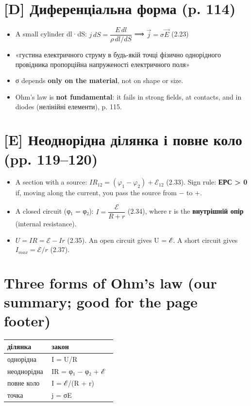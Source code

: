 \documentclass[11pt,a4paper,oneside]{book}
\begin{document}
\section*{[D] Диференціальна форма (p. 114)}
\begin{itemize}
\item A small cylinder dl·dS: $j\,dS = \dfrac{E\,dl}{\rho\,dl/dS}$ ⟹ $\vec j = \sigma\vec E$ (2.23)
\item «густина електричного струму в будь-якій точці фізично однорідного провідника пропорційна напруженості електричного поля»
\item σ depends \textbf{only on the material}, not on shape or size.
\item Ohm's law is \textbf{not fundamental}: it fails in strong fields, at contacts, and in diodes (нелінійні елементи), p. 115.
\end{itemize}

\section*{[E] Неоднорідна ділянка і повне коло (pp. 119–120)}
\begin{itemize}
\item A section with a source: $IR_{12} = (\varphi_1-\varphi_2) + \mathcal E_{12}$ (2.33). Sign rule: \textbf{ЕРС > 0} if, moving along the current, you pass the source from − to +.
\item A closed circuit (φ₁ = φ₂): $I = \dfrac{\mathcal E}{R+r}$ (2.34), where r is the \textbf{внутрішній опір} (internal resistance).
\item $U = IR = \mathcal E - Ir$ (2.35). An open circuit gives U = ℰ. A short circuit gives $I_{max} = \mathcal E/r$ (2.37).
\end{itemize}

\section*{Three forms of Ohm's law (our summary; good for the page footer)}
{\small
\begin{longtable}{>{\raggedright\arraybackslash}p{0.394\linewidth}>{\raggedright\arraybackslash}p{0.574\linewidth}}
\toprule
\textbf{ділянка} & \textbf{закон} \\
\midrule
\endhead
однорідна & I = U/R \\
неоднорідна & IR = φ₁ − φ₂ + ℰ \\
повне коло & I = ℰ/(R + r) \\
точка & j = σE \\
\bottomrule
\end{longtable}
}
\end{document}
